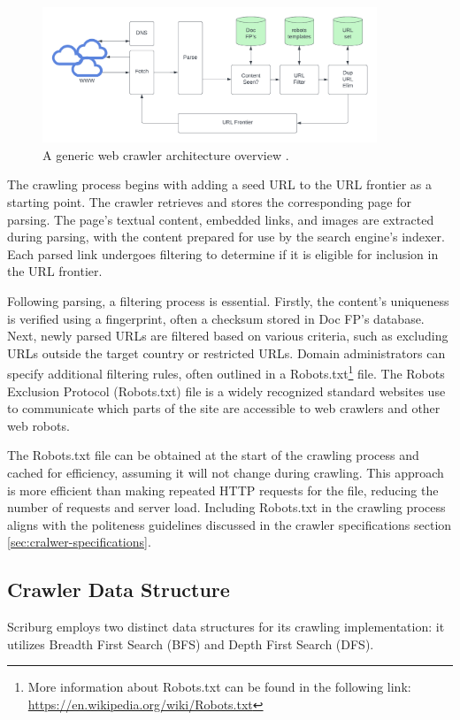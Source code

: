 \begin{figure}[h]	
     \centering
     \includegraphics[width=10cm]{images/crawler_architecture.png}
     \caption{A generic web crawler architecture overview \cite{introduction-ir}.}
     \label{fig:web-crawler-arch}
\end{figure}

The crawling process begins with adding a seed URL to the URL frontier as a starting point. The crawler retrieves and stores the corresponding page for parsing. The page's textual content, embedded links, and images are extracted during parsing, with the content prepared for use by the search engine's indexer. Each parsed link undergoes filtering to determine if it is eligible for inclusion in the URL frontier.

Following parsing, a filtering process is essential. Firstly, the content's uniqueness is verified using a fingerprint, often a checksum stored in Doc FP's database. Next, newly parsed URLs are filtered based on various criteria, such as excluding URLs outside the target country or restricted URLs. Domain administrators can specify additional filtering rules, often outlined in a Robots.txt\footnote{More information about Robots.txt can be found in the following link:  \url{https://en.wikipedia.org/wiki/Robots.txt}} file. The Robots Exclusion Protocol (Robots.txt) file is a widely recognized standard websites use to communicate which parts of the site are accessible to web crawlers and other web robots.

The Robots.txt file can be obtained at the start of the crawling process and cached for efficiency, assuming it will not change during crawling. This approach is more efficient than making repeated HTTP requests for the file, reducing the number of requests and server load. Including Robots.txt in the crawling process aligns with the politeness guidelines discussed in the crawler specifications section \ref{sec:cralwer-specifications}.

\subsection{Crawler Data Structure}
Scriburg employs two distinct data structures for its crawling implementation: it utilizes Breadth First Search (BFS) and Depth First Search (DFS).

